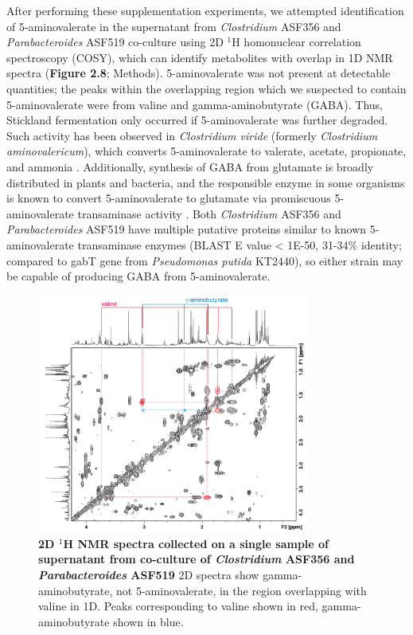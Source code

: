 \documentclass[11pt,twocolumn,notitlepage,openany,twoside]{book}
\begin{document}
\begin{refsection}
After performing these supplementation experiments, we attempted identification of 5-aminovalerate in the supernatant from \textit{Clostridium} ASF356 and \textit{Parabacteroides} ASF519 co-culture using 2D $^1\!$H homonuclear correlation spectroscopy (COSY), which can identify metabolites with overlap in 1D NMR spectra (\textbf{Figure 2.8}; Methods). 5-aminovalerate was not present at detectable quantities; the peaks within the overlapping region which we suspected to contain 5-aminovalerate were from valine and gamma-aminobutyrate (GABA). Thus, Stickland fermentation only occurred if 5-aminovalerate was further degraded. Such activity has been observed in \textit{Clostridium viride} (formerly \textit{Clostridium aminovalericum}), which converts 5-aminovalerate to valerate, acetate, propionate, and ammonia \cite{Barker1985-rs,Barker1987-jt}. Additionally, synthesis of GABA from glutamate is broadly distributed in plants and bacteria, and the responsible enzyme in some organisms is known to convert 5-aminovalerate to glutamate via promiscuous 5-aminovalerate transaminase activity \cite{Shin2016-vy,Yonaha1985-xp}. Both \textit{Clostridium} ASF356 and \textit{Parabacteroides} ASF519 have multiple putative proteins similar to known 5-aminovalerate transaminase enzymes (BLAST E value \textless\! 1E-50, 31-34\% identity; compared to gabT gene from \textit{Pseudomonas putida} KT2440), so either strain may be capable of producing GABA from 5-aminovalerate.

\begin{figure}[tb]
\centering
\includegraphics[width=0.8\textwidth]{ch2_figS5}
\caption[2D $^1\!$H NMR spectra collected on a single sample of supernatant from co-culture of \textit{Clostridium} ASF356 and \textit{Parabacteroides} ASF519]{\textbf{2D $^1\!$H NMR spectra collected on a single sample of supernatant from co-culture of \textit{Clostridium} ASF356 and \textit{Parabacteroides} ASF519} 2D spectra show gamma-aminobutyrate, not 5-aminovalerate, in the region overlapping with valine in 1D. Peaks corresponding to valine shown in red, gamma-aminobutyrate shown in blue.}
\end{figure}


\end{refsection}
\end{document}
